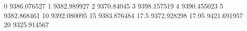 0	     9386.076527
1	     9382.989927
2	     9370.84045
3	     9398.157519
4	     9390.455023
5	     9382.868461
10     9392.080095
15     9383.876484
17.5  9372.928298
17.95  9421.691957
20     9325.914567	

	
	
	
	
	
	
	
	
	
	
	